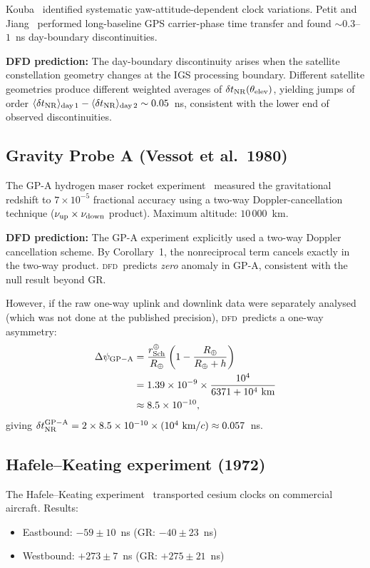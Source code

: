 \documentclass[aps,prl,twocolumn,superscriptaddress,showpacs]{revtex4-2}
\newcommand{\DFD}{\textsc{dfd}}
\newcommand{\Rearth}{R_\oplus}
\newcommand{\rSch}{r_{\rm Sch}}
\begin{document}
Kouba~\cite{Kouba2009} identified systematic yaw-attitude-dependent
clock variations.  Petit and Jiang~\cite{PetitJiang2008} performed
long-baseline GPS carrier-phase time transfer and found
$\sim 0.3$--$1$~ns day-boundary discontinuities.

\textbf{DFD prediction:}  The day-boundary discontinuity arises
when the satellite constellation geometry changes at the IGS
processing boundary.  Different satellite geometries produce
different weighted averages of $\delta t_{\rm NR}(\theta_{\rm elev})$,
yielding jumps of order $\langle\delta t_{\rm NR}\rangle_{\rm day\,1}
- \langle\delta t_{\rm NR}\rangle_{\rm day\,2} \sim 0.05$~ns,
consistent with the lower end of observed discontinuities.

\subsection{Gravity Probe A (Vessot et al.\ 1980)}

The GP-A hydrogen maser rocket experiment~\cite{Vessot1980}
measured the gravitational redshift to $7\times 10^{-5}$
fractional accuracy using a two-way Doppler-cancellation technique
($\nu_{\rm up}\times\nu_{\rm down}$ product).  Maximum altitude:
$10\,000$~km.

\textbf{DFD prediction:}  The GP-A experiment explicitly used a
two-way Doppler cancellation scheme.  By Corollary~1, the
nonreciprocal term cancels exactly in the two-way product.
\DFD\ predicts \emph{zero} anomaly in GP-A, consistent with the
null result beyond GR.

However, if the raw one-way uplink and downlink data were
separately analysed (which was not done at the published
precision), \DFD\ predicts a one-way asymmetry:
\begin{align}
\Delta\psi_{\rm GP-A} &= \frac{\rSch^\oplus}{\Rearth}
\left(1 - \frac{\Rearth}{\Rearth + h}\right) \nonumber\\
&= 1.39\times 10^{-9}\times\frac{10^4}{6371 + 10^4\text{ km}} \nonumber\\
&\approx 8.5\times 10^{-10},
\end{align}
giving $\delta t_{\rm NR}^{\rm GP-A} = 2\times 8.5\times 10^{-10}
\times (10^4\text{ km}/c) \approx 0.057$~ns.

\subsection{Hafele--Keating experiment (1972)}

The Hafele--Keating experiment~\cite{HafeleKeating1972a,HafeleKeating1972b}
transported cesium clocks on commercial aircraft.  Results:
\begin{itemize}
\item Eastbound: $-59\pm 10$~ns (GR: $-40\pm 23$~ns)
\item Westbound: $+273\pm 7$~ns (GR: $+275\pm 21$~ns)
\end{itemize}
\end{document}
